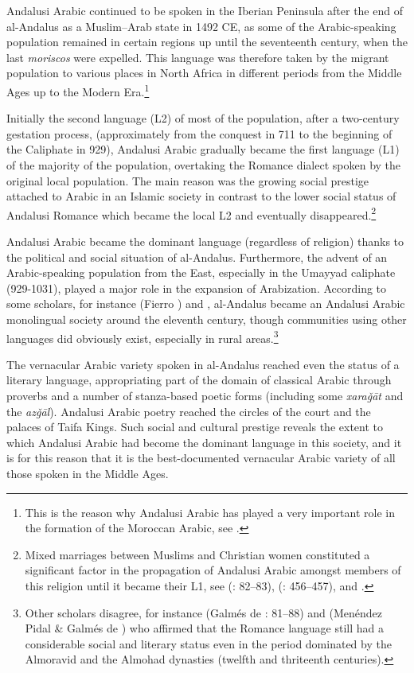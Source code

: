 \documentclass[output=paper,modfonts,nonflat]{langsci/langscibook}
\begin{document}
Andalusi Arabic continued to be spoken in the Iberian Peninsula after the end of al-Andalus as a Muslim–Arab state in 1492 CE, as some of the Arabic-speaking population remained in certain regions up until the seventeenth century, when the last \textit{moriscos} were expelled. This language was therefore taken by the migrant population to various places in North Africa in different periods from the Middle Ages up to the Modern Era.\footnote{This is the reason why Andalusi Arabic has played a very important role in the formation of the Moroccan Arabic, see \citep{Vicente2010}.} 

Initially the second language (L2) of most of the population, after a two-century gestation process, (approximately from the conquest in 711 to the beginning of the Caliphate in 929), Andalusi Arabic gradually became the first language (L1) of the majority of the population, overtaking the Romance dialect spoken by the original local population. The main reason was the growing social prestige attached to Arabic in an Islamic society in contrast to the lower social status of Andalusi Romance which became the local L2 and eventually disappeared.\footnote{Mixed marriages between Muslims and Christian women constituted a significant factor in the propagation of Andalusi Arabic amongst members of this religion until it became their L1, see (\citealt{Guichard1989}: 82–83), (\citealt{Guichard1995}: 456–457), and \citep{Chalmeta2003}.}  

Andalusi Arabic became the dominant language (regardless of religion) thanks to the political and social situation of al-Andalus. Furthermore, the advent of an Arabic-speaking population from the East, especially in the Umayyad caliphate (929-1031), played a major role in the expansion of Arabization. According to some scholars, for instance (Fierro \citealt{Bello2001}) and \citep[104]{Corriente2008}, al-Andalus became an Andalusi Arabic monolingual society around the eleventh century, though communities using other languages did obviously exist, especially in rural areas.\footnote{Other scholars disagree, for instance (Galmés de \citealt{Fuentes1994}: 81–88) and (Menéndez Pidal \& Galmés de \citealt{Fuentes2001}) who affirmed that the Romance language still had a considerable social and literary status even in the period dominated by the Almoravid and the Almohad dynasties (twelfth and thriteenth centuries).}  

The vernacular Arabic variety spoken in al-Andalus reached even the status of a literary language, appropriating part of the domain of classical Arabic through proverbs and a number of stanza-based poetic forms (including some \textit{xaraǧāt} and the \textit{azǧāl}). Andalusi Arabic poetry reached the circles of the court and the palaces of Taifa Kings. Such social and cultural prestige reveals the extent to which Andalusi Arabic had become the dominant language in this society, and it is for this reason that it is the best-documented vernacular Arabic variety of all those spoken in the Middle Ages. 
\end{document}

